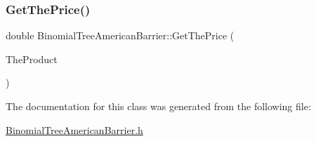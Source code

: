 \hypertarget{classBinomialTreeAmericanBarrier_a6119001ee5107dbd5e19881a47e22fdd}{}\label{classBinomialTreeAmericanBarrier_a6119001ee5107dbd5e19881a47e22fdd} 
\subsubsection{\texorpdfstring{Get\+The\+Price()}{GetThePrice()}}
{\footnotesize\ttfamily double Binomial\+Tree\+American\+Barrier\+::\+Get\+The\+Price (\begin{DoxyParamCaption}\item[{const \hyperlink{classTreeProduct}{Tree\+Product} \&}]{The\+Product }\end{DoxyParamCaption})}



The documentation for this class was generated from the following file\+:\begin{DoxyCompactItemize}
\item 
\hyperlink{BinomialTreeAmericanBarrier_8h}{Binomial\+Tree\+American\+Barrier.\+h}\end{DoxyCompactItemize}
